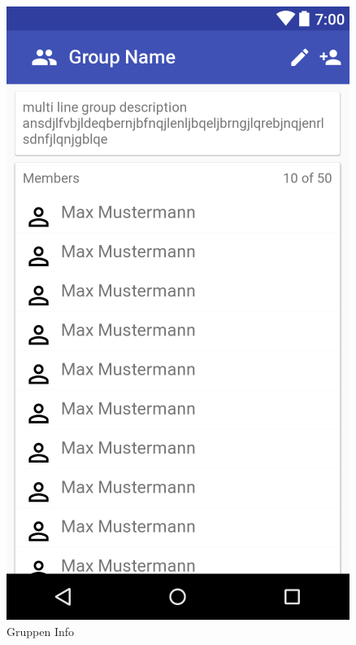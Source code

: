\documentclass[parskip=full]{scrartcl}
\begin{document}
\begin{figure}[H]
	\centering
	\includegraphics[width=.7\textwidth]{GUI/AndroidStudio/group_info.PNG}
	\caption{Gruppen Info}	
\end{figure}
\end{document}
